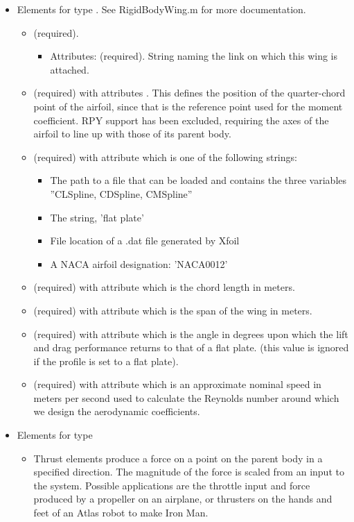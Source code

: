 \begin{itemize}
\begin{itemize}
\item Elements for type .  See RigidBodyWing.m for more documentation.
\begin{itemize}
\item {} (required). 
\begin{itemize} 
\item Attributes:  (required).  String naming
  the link on which this wing is attached.
\end{itemize}
\item {} (required) with attributes .
  This defines the position of the quarter-chord point of the airfoil, since that is the reference point used for the moment coefficient. RPY support has been excluded, requiring the axes of the airfoil to line up with those of its parent body.
\item {} (required) with attribute  which is one of
  the following strings:  
\begin{itemize}
\item The path to a  file that can be loaded and contains the three variables ''CLSpline, CDSpline, CMSpline''
\item The string, 'flat plate'
\item File location of a .dat file generated by Xfoil
\item A NACA airfoil designation: 'NACA0012'
\end{itemize}
\item {} (required) with attribute  which is the chord
  length in meters.  
\item {} (required) with attribute  which is the span of
  the wing in meters.  
\item {} (required) with attribute  which is the
  angle in degrees upon which the lift and drag performance returns to
  that of a flat plate.  (this value is ignored if the profile is set
  to a flat plate).  
\item {} (required) with attribute  which is an
  approximate nominal speed in meters per second used to calculate the
  Reynolds number around which we design the aerodynamic coefficients.
\end{itemize}
\item Elements for type 
\begin{itemize}
\item Thrust elements produce a force on a point on the parent body in a specified direction.  The magnitude of the force is scaled from an input to the system. Possible applications are the throttle input and force produced by a propeller on an airplane, or thrusters on the hands and feet of an Atlas robot to make Iron Man.

\end{itemize}
\end{itemize}
\end{itemize}
